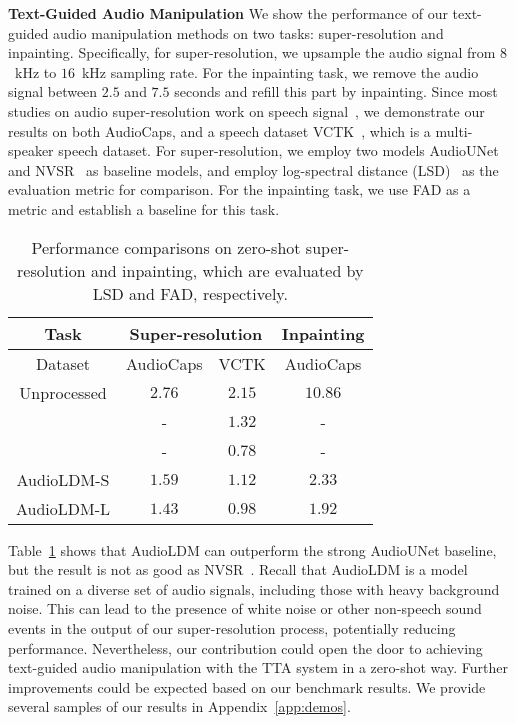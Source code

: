 \documentclass{article}
\begin{document}
\textbf{Text-Guided Audio Manipulation} We show the performance of our text-guided audio manipulation methods on two tasks: super-resolution and inpainting. Specifically, for super-resolution, we upsample the audio signal from $8$~kHz to $16$~kHz sampling rate. For the inpainting task, we remove the audio signal between $2.5$ and $7.5$ seconds and refill this part by inpainting. Since most studies on audio super-resolution work on speech signal~\cite{liu2021voicefixer, liu2022neural}, we demonstrate our results on both AudioCaps, and a speech dataset VCTK~\cite{vctk-yamagishi2019cstr}, which is a multi-speaker speech dataset. For super-resolution, we employ two models AudioUNet~\cite{kuleshov2017audio} and NVSR~\cite{liu2022neural} as baseline models, and employ log-spectral distance (LSD)~\cite{heming-towards-sr-wang2021towards} as the evaluation metric for comparison. For the inpainting task, we use FAD as a metric and establish a baseline for this task. 
\begin{table}[tbp]
\centering
\small
\begin{tabular}{cccc}
\toprule
Task          & \multicolumn{2}{c}{Super-resolution}  &  Inpainting     \\
\midrule
Dataset       & AudioCaps            & VCTK                 & AudioCaps            \\
\midrule
Unprocessed   &          $2.76$            &      $2.15$                &   $10.86$                   \\
\citet{kuleshov2017audio}     & -                    & $1.32$                 & -                    \\
\citet{liu2022neural}          & -                    & $\mathbf{0.78}$                 & -                    \\
AudioLDM-S &         $1.59$             &     $1.12$                 &   $2.33$                   \\
AudioLDM-L & $\mathbf{1.43}$ & $0.98$ & $\mathbf{1.92}$ \\
\bottomrule
\end{tabular}
\caption{Performance comparisons on zero-shot super-resolution and inpainting, which are evaluated by LSD and FAD, respectively.}
\label{tab: audiomanipulation}
\end{table}
Table~\ref{tab: audiomanipulation} shows that AudioLDM can outperform the strong AudioUNet baseline, but the result is not as good as NVSR~\cite{liu2022neural}. 
Recall that AudioLDM is a model trained on a diverse set of audio signals, including those with heavy background noise. This can lead to the presence of white noise or other non-speech sound events in the output of our super-resolution process, potentially reducing performance. 
Nevertheless, our contribution could open the door to achieving text-guided audio manipulation with the TTA system in a zero-shot way. Further improvements could be expected based on our benchmark results. We provide several samples of our results in Appendix~\ref{app:demos}. 
\end{document}

